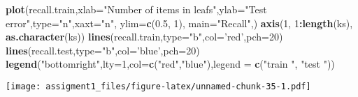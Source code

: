 \documentclass[
]{article}
\newenvironment{Shaded}{\begin{snugshade}}{\end{snugshade}}
\newcommand{\DataTypeTok}[1]{\textcolor[rgb]{0.13,0.29,0.53}{#1}}
\newcommand{\DecValTok}[1]{\textcolor[rgb]{0.00,0.00,0.81}{#1}}
\newcommand{\FloatTok}[1]{\textcolor[rgb]{0.00,0.00,0.81}{#1}}
\newcommand{\KeywordTok}[1]{\textcolor[rgb]{0.13,0.29,0.53}{\textbf{#1}}}
\newcommand{\NormalTok}[1]{#1}
\newcommand{\OperatorTok}[1]{\textcolor[rgb]{0.81,0.36,0.00}{\textbf{#1}}}
\newcommand{\StringTok}[1]{\textcolor[rgb]{0.31,0.60,0.02}{#1}}
\begin{document}
\begin{Shaded}
\begin{Highlighting}[]
\KeywordTok{plot}\NormalTok{(recall.train,}\DataTypeTok{xlab=}\StringTok{"Number of items in leafs"}\NormalTok{,}\DataTypeTok{ylab=}\StringTok{"Test error"}\NormalTok{,}\DataTypeTok{type=}\StringTok{"n"}\NormalTok{,}\DataTypeTok{xaxt=}\StringTok{"n"}\NormalTok{, }\DataTypeTok{ylim=}\KeywordTok{c}\NormalTok{(}\FloatTok{0.5}\NormalTok{, }\DecValTok{1}\NormalTok{),  }\DataTypeTok{main=}\StringTok{"Recall"}\NormalTok{,)}
\KeywordTok{axis}\NormalTok{(}\DecValTok{1}\NormalTok{, }\DecValTok{1}\OperatorTok{:}\KeywordTok{length}\NormalTok{(ks), }\KeywordTok{as.character}\NormalTok{(ks))}
\KeywordTok{lines}\NormalTok{(recall.train,}\DataTypeTok{type=}\StringTok{"b"}\NormalTok{,}\DataTypeTok{col=}\StringTok{'red'}\NormalTok{,}\DataTypeTok{pch=}\DecValTok{20}\NormalTok{)}
\KeywordTok{lines}\NormalTok{(recall.test,}\DataTypeTok{type=}\StringTok{"b"}\NormalTok{,}\DataTypeTok{col=}\StringTok{'blue'}\NormalTok{,}\DataTypeTok{pch=}\DecValTok{20}\NormalTok{)}
\KeywordTok{legend}\NormalTok{(}\StringTok{"bottomright"}\NormalTok{,}\DataTypeTok{lty=}\DecValTok{1}\NormalTok{,}\DataTypeTok{col=}\KeywordTok{c}\NormalTok{(}\StringTok{"red"}\NormalTok{,}\StringTok{"blue"}\NormalTok{),}\DataTypeTok{legend =} \KeywordTok{c}\NormalTok{(}\StringTok{"train "}\NormalTok{, }\StringTok{"test "}\NormalTok{))}
\end{Highlighting}
\end{Shaded}

\texttt{[image: assigment1\_files/figure-latex/unnamed-chunk-35-1.pdf]}
\end{document}

